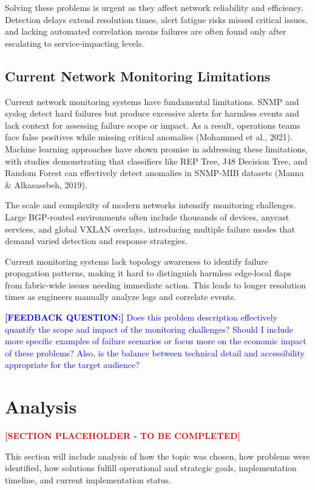 \documentclass[11pt]{article}
\begin{document}
Solving these problems is urgent as they affect network reliability and efficiency. Detection delays extend resolution times, alert fatigue risks missed critical issues, and lacking automated correlation means failures are often found only after escalating to service-impacting levels.

\subsection{Current Network Monitoring Limitations}

Current network monitoring systems have fundamental limitations. SNMP and syslog detect hard failures but produce excessive alerts for harmless events and lack context for assessing failure scope or impact. As a result, operations teams face false positives while missing critical anomalies (Mohammed et al., 2021). Machine learning approaches have shown promise in addressing these limitations, with studies demonstrating that classifiers like REP Tree, J48 Decision Tree, and Random Forest can effectively detect anomalies in SNMP-MIB datasets (Manna \& Alkasassbeh, 2019).

The scale and complexity of modern networks intensify monitoring challenges. Large BGP-routed environments often include thousands of devices, anycast services, and global VXLAN overlays, introducing multiple failure modes that demand varied detection and response strategies.

Current monitoring systems lack topology awareness to identify failure propagation patterns, making it hard to distinguish harmless edge-local flaps from fabric-wide issues needing immediate action. This leads to longer resolution times as engineers manually analyze logs and correlate events.

\textcolor{blue}{\textbf{[FEEDBACK QUESTION:]} Does this problem description effectively quantify the scope and impact of the monitoring challenges? Should I include more specific examples of failure scenarios or focus more on the economic impact of these problems? Also, is the balance between technical detail and accessibility appropriate for the target audience?}

\section{Analysis}

\textcolor{red}{\textbf{[SECTION PLACEHOLDER - TO BE COMPLETED]}}

This section will include analysis of how the topic was chosen, how problems were identified, how solutions fulfill operational and strategic goals, implementation timeline, and current implementation status.
\end{document}
